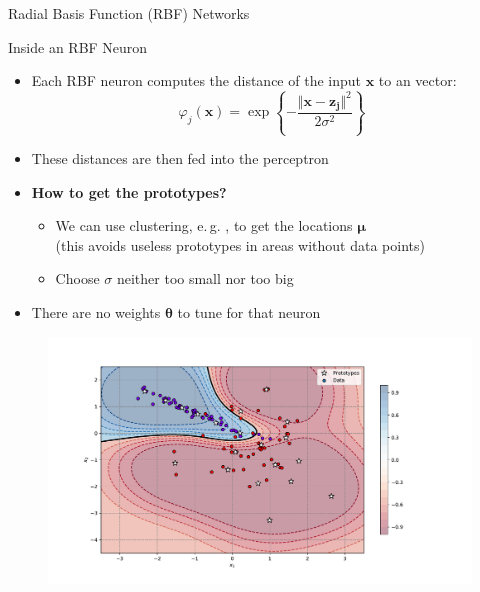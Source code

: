 \begin{frame}{Radial Basis Function (RBF) Networks}{}
	
\end{frame}


\begin{frame}{Inside an RBF Neuron}{}
	\begin{itemize}
		\item Each RBF neuron computes the distance of the input $\bm{x}$ to an  vector:
		\begin{equation}
			\varphi_j(\bm{x}) = \exp\left\{ -\frac{\Vert \bm{x} - \bm{z_j} \Vert^2}{2\sigma^2} \right\}
		\end{equation}
		\item These distances are then fed into the perceptron
		\item \textbf{How to get the prototypes?}
		\begin{itemize}
			\item We can use clustering, e.\,g. , to get the locations $\bm{\mu}$ \\
				{\footnotesize (this avoids useless prototypes in areas without data points)}
			\item Choose $\sigma$ neither too small nor too big
		\end{itemize}
		\item There are no weights $\bm{\theta}$ to tune for that neuron
	\end{itemize}
\end{frame}


\begin{frame}[plain]{}{}
	\vspace*{-7mm}
	\begin{figure}
		\centering
		\includegraphics[scale=0.55]{10_deep_learning/02_img/rbfn}
	\end{figure}
\end{frame}



